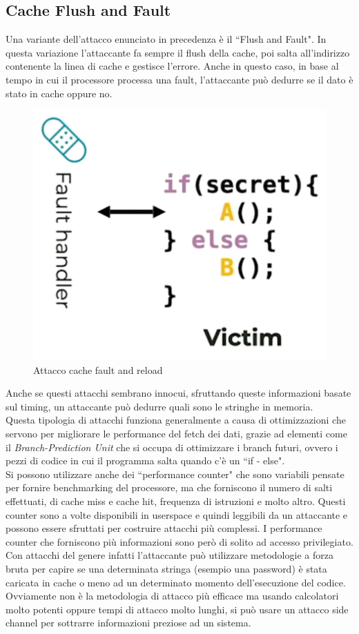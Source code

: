 \subsection*{Cache Flush and Fault}
Una variante dell'attacco enunciato in precedenza è il ``Flush and Fault". In questa variazione l'attaccante fa sempre il flush della cache, poi salta all'indirizzo contenente la linea di cache e gestisce l'errore. Anche in questo caso, in base al tempo in cui il processore processa una fault, l'attaccante può dedurre se il dato è stato in cache oppure no.
\FloatBarrier
\vspace{1cm}
\begin{figure}[!htbp]
    \centering
    \includegraphics[width=0.4\linewidth]{images/fault-reload.png}
    \caption{Attacco cache fault and reload}
\end{figure}
\vspace{1cm}
\FloatBarrier
Anche se questi attacchi sembrano innocui, sfruttando queste informazioni basate sul timing, un attaccante può dedurre quali sono le stringhe in memoria.\\
\newline
Questa tipologia di attacchi funziona generalmente a causa di ottimizzazioni che servono per migliorare le performance del fetch dei dati, grazie ad elementi come il \textit{Branch-Prediction Unit} che si occupa di ottimizzare i branch futuri, ovvero i pezzi di codice in cui il programma salta quando c'è un  ``if - else".\\
Si possono utilizzare anche dei ``performance counter" che sono variabili pensate per fornire benchmarking del processore, ma che forniscono il numero di salti effettuati, di cache miss e cache hit, frequenza di istruzioni e molto altro. Questi counter sono a volte disponibili in userspace e quindi leggibili da un attaccante e possono essere sfruttati per costruire attacchi più complessi. I performance counter che forniscono più informazioni sono però di solito ad accesso privilegiato.
\newline
Con attacchi del genere infatti l'attaccante può utilizzare metodologie a forza bruta per capire se una determinata stringa (esempio una password) è stata caricata in cache o meno ad un determinato momento dell'esecuzione del codice. Ovviamente non è la metodologia di attacco più efficace ma usando calcolatori molto potenti oppure tempi di attacco molto lunghi, si può usare un attacco side channel per sottrarre informazioni preziose ad un sistema.\\
